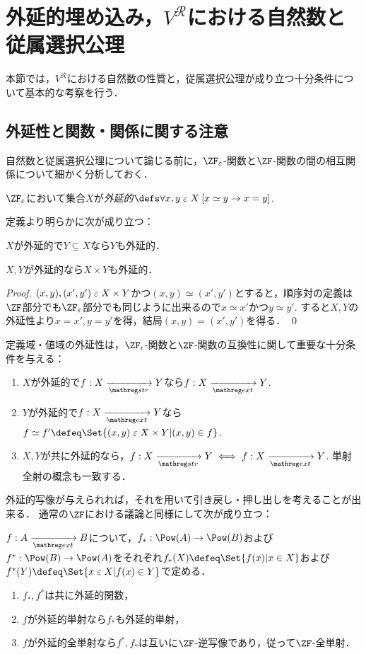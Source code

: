\documentclass[realisability.tex]{subfiles}
\begin{document}
\section{外延的埋め込み，$V^{\mathcal{R}}$における自然数と従属選択公理}
本節では，$V^{\mathcal{R}}$における自然数の性質と，従属選択公理が成り立つ十分条件について基本的な考察を行う．

\subsection{外延性と関数・関係に関する注意}
自然数と従属選択公理について論じる前に，$\ZFe$-関数と$\ZF$-関数の間の相互関係について細かく分析しておく．

\begin{definition}
 $\ZFe$において集合$X$が\emph{外延的}$\defs \forall x, y \strin X \: [x \simeq y \to x = y]$.
\end{definition}

定義より明らかに次が成り立つ：

\begin{lemma}
 $X$が外延的で$Y \subseteq X$なら$Y$も外延的．
\end{lemma}
\begin{lemma}
 $X, Y$が外延的なら$X \times Y$も外延的．
\end{lemma}
\begin{proof}
 $(x, y), (x', y') \mathrel{\varepsilon} X \times Y$かつ$(x, y) \simeq (x', y')$とすると，順序対の定義は$\ZF$部分でも$\ZFe$部分でも同じように出来るので$x \simeq x'$かつ$y \simeq y'$.
 すると$X, Y$の外延性より$x = x', y = y'$を得，結局$(x, y) = (x', y')$を得る． \qed
\end{proof}

定義域・値域の外延性は，$\ZF_\epsilon$-関数と$\ZF$-関数の互換性に関して重要な十分条件を与える：
\begin{lemma}
 \begin{enumerate}
  \item $X$が外延的で$f: X \strto Y$なら$f: X \extto Y$.
  \item $Y$が外延的で$f: X \extto Y$なら$f \simeq f' \defeq \Set{(x, y) \strin X \times Y | (x, y) \in f}$.
  \item $X, Y$が共に外延的なら，$f: X \strto Y \iff f: X \extto Y$. 単射全射の概念も一致する．
 \end{enumerate}
\end{lemma}

外延的写像が与えられれば，それを用いて引き戻し・押し出しを考えることが出来る．
通常の$\ZF$における議論と同様にして次が成り立つ：
\begin{lemma}
 $f: A \extto B$について，$f_*: \Pow(A) \to \Pow(B)$および$f^*: \Pow(B) \to \Pow(A)$をそれぞれ$f_*(X) \defeq \Set{ f(x) | x \in X }$および$f^*(Y) \defeq \Set{x \strin X | f(x) \in Y}$で定める．
 \begin{enumerate}
  \item $f_*, f^*$は共に外延的関数，
  \item $f$が外延的単射なら$f_*$も外延的単射，
  \item $f$が外延的全単射なら$f^*, f_*$は互いに$\ZF$-逆写像であり，従って$\ZF$-全単射．
 \end{enumerate}
\end{lemma}
\end{document}

